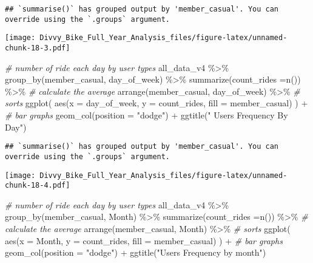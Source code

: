 \documentclass[
]{article}
\newenvironment{Shaded}{\begin{snugshade}}{\end{snugshade}}
\newcommand{\AttributeTok}[1]{\textcolor[rgb]{0.77,0.63,0.00}{#1}}
\newcommand{\CommentTok}[1]{\textcolor[rgb]{0.56,0.35,0.01}{\textit{#1}}}
\newcommand{\FunctionTok}[1]{\textcolor[rgb]{0.00,0.00,0.00}{#1}}
\newcommand{\NormalTok}[1]{#1}
\newcommand{\SpecialCharTok}[1]{\textcolor[rgb]{0.00,0.00,0.00}{#1}}
\newcommand{\StringTok}[1]{\textcolor[rgb]{0.31,0.60,0.02}{#1}}
\begin{document}
\begin{verbatim}
## `summarise()` has grouped output by 'member_casual'. You can override using the `.groups` argument.
\end{verbatim}

\texttt{[image: Divvy\_Bike\_Full\_Year\_Analysis\_files/figure-latex/unnamed-chunk-18-3.pdf]}

\begin{Shaded}
\begin{Highlighting}[]
\CommentTok{\# number of ride each day by user types }
\NormalTok{   all\_data\_v4 }\SpecialCharTok{\%\textgreater{}\%}
      \FunctionTok{group\_by}\NormalTok{(member\_casual, day\_of\_week) }\SpecialCharTok{\%\textgreater{}\%}
      \FunctionTok{summarize}\NormalTok{(}\AttributeTok{count\_rides =}\FunctionTok{n}\NormalTok{()) }\SpecialCharTok{\%\textgreater{}\%} \CommentTok{\# calculate the average}
      \FunctionTok{arrange}\NormalTok{(member\_casual, day\_of\_week) }\SpecialCharTok{\%\textgreater{}\%}                     \CommentTok{\# sorts}
      \FunctionTok{ggplot}\NormalTok{( }\FunctionTok{aes}\NormalTok{(}\AttributeTok{x =}\NormalTok{ day\_of\_week, }\AttributeTok{y =}\NormalTok{ count\_rides, }\AttributeTok{fill =}\NormalTok{ member\_casual) ) }\SpecialCharTok{+} \CommentTok{\# bar graphs}
      \FunctionTok{geom\_col}\NormalTok{(}\AttributeTok{position =} \StringTok{"dodge"}\NormalTok{)  }\SpecialCharTok{+} \FunctionTok{ggtitle}\NormalTok{(}\StringTok{" Users Frequency By Day"}\NormalTok{)}
\end{Highlighting}
\end{Shaded}

\begin{verbatim}
## `summarise()` has grouped output by 'member_casual'. You can override using the `.groups` argument.
\end{verbatim}

\texttt{[image: Divvy\_Bike\_Full\_Year\_Analysis\_files/figure-latex/unnamed-chunk-18-4.pdf]}

\begin{Shaded}
\begin{Highlighting}[]
\CommentTok{\#  number of ride each day by user types }
\NormalTok{   all\_data\_v4 }\SpecialCharTok{\%\textgreater{}\%}
      \FunctionTok{group\_by}\NormalTok{(member\_casual, Month) }\SpecialCharTok{\%\textgreater{}\%}
      \FunctionTok{summarize}\NormalTok{(}\AttributeTok{count\_rides =}\FunctionTok{n}\NormalTok{()) }\SpecialCharTok{\%\textgreater{}\%} \CommentTok{\# calculate the average}
      \FunctionTok{arrange}\NormalTok{(member\_casual, Month) }\SpecialCharTok{\%\textgreater{}\%}                     \CommentTok{\# sorts}
      \FunctionTok{ggplot}\NormalTok{( }\FunctionTok{aes}\NormalTok{(}\AttributeTok{x =}\NormalTok{ Month, }\AttributeTok{y =}\NormalTok{ count\_rides, }\AttributeTok{fill =}\NormalTok{ member\_casual) ) }\SpecialCharTok{+} \CommentTok{\# bar graphs}
      \FunctionTok{geom\_col}\NormalTok{(}\AttributeTok{position =} \StringTok{"dodge"}\NormalTok{)  }\SpecialCharTok{+} \FunctionTok{ggtitle}\NormalTok{(}\StringTok{"Users Frequency by month"}\NormalTok{)}
\end{Highlighting}
\end{Shaded}
\end{document}
